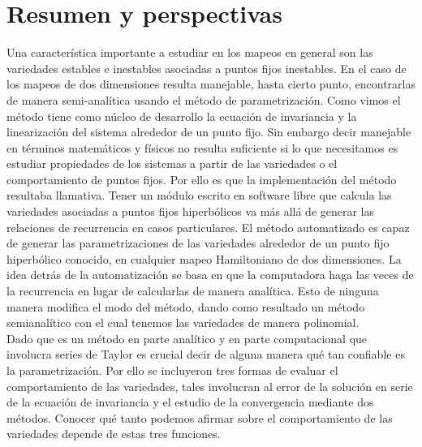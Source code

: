 
\chapter{Resumen y perspectivas}
Una característica importante a estudiar en los mapeos en general son las variedades estables e inestables asociadas a puntos fijos inestables. En el caso de los mapeos de dos dimensiones resulta manejable, hasta cierto punto, encontrarlas de manera semi-analítica usando el método de parametrización. Como vimos el método tiene como núcleo de desarrollo la ecuación de invariancia y la linearización del sistema alrededor de un punto fijo. Sin embargo decir manejable en términos matemáticos y físicos no resulta suficiente si lo que necesitamos es estudiar propiedades de los sistemas a partir de las variedades o el comportamiento de puntos fijos. Por ello es que la implementación del método resultaba llamativa. Tener un módulo escrito en software libre que calcula las variedades asociadas a puntos fijos hiperbólicos va más allá de generar las relaciones de recurrencia en casos particulares. El método automatizado es capaz de generar las parametrizaciones de las variedades alrededor de un punto fijo hiperbólico conocido, en cualquier mapeo Hamiltoniano de dos dimensiones. La idea detrás de la automatización se basa en que la computadora haga las veces de la recurrencia en lugar de calcularlas de manera analítica. Esto de ninguna manera modifica el modo del método, dando como resultado un método semianalítico con el cual tenemos las variedades de manera polinomial. \\

Dado que es un método en parte analítico y en parte computacional que involucra series de Taylor es crucial decir de alguna manera qué tan confiable es la parametrización. Por ello se incluyeron tres formas de evaluar el comportamiento de las variedades, tales involucran al error de la solución en serie de la ecuación de invariancia y el estudio de la convergencia mediante dos métodos. Conocer qué tanto podemos afirmar sobre el comportamiento de las variedades depende de estas tres funciones.\\


